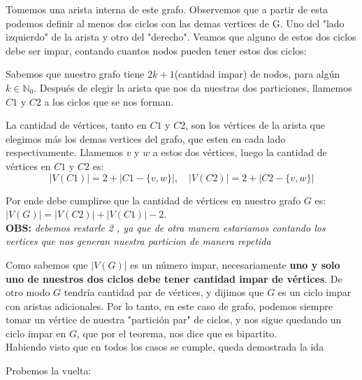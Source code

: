 \documentclass{article}
\begin{document}
\begin{itemize}
\begin{center}
\end{center}
Tomemos una arista interna de este grafo. Observemos que a partir de esta  podemos definir al menos dos ciclos con las demas vertices de G. Uno del "lado izquierdo" de la arista y otro del "derecho". Veamos que alguno de estos dos ciclos debe ser impar, contando cuantos nodos pueden tener estos dos ciclos:

Sabemos que nuestro grafo tiene $2k + 1$(cantidad impar) de nodos, para algún $k \in \mathbb{N}_0$. Después de elegir la arista que nos da nuestras dos particiones, llamemos $C1$ y $C2$ a los ciclos que se nos forman.

La cantidad de vértices, tanto en $C1$ y $C2$, son los vértices de la arista que elegimos más los demas vertices del grafo, que esten en cada lado respectivamente. Llamemos $v$ y $w$ a estos dos vértices, luego la cantidad de vértices en $C1$ y $C2$ es:
\[|V(C1)| = 2 + |C1 - \{v,w\}|, \quad |V(C2)| = 2 + |C2 - \{v,w\}|\]

Por ende debe cumplirse que la cantidad de vértices en nuestro grafo $G$ es:  $ |V(G)| = |V(C2)| + |V(C1)| - 2$.\\
\textbf{OBS:}\textit{ debemos restarle 2 , ya que de otra manera estariamos contando los vertices que nos generan nuestra particion de manera repetida}

Como sabemos que $|V(G)|$ es un número impar, necesariamente \textbf{uno y solo uno de nuestros dos ciclos debe tener cantidad impar de vértices}. De otro modo $G$ tendría cantidad par de vértices, y dijimos que $G$ es un ciclo impar con aristas adicionales. Por lo tanto, en este caso de grafo, podemos siempre tomar un vértice de nuestra "partición par" de ciclos, y nos sigue quedando un ciclo impar en $G$, que por el teorema, nos dice que es bipartito.\\

Habiendo visto que en todos los casos se cumple, queda demostrada la ida

\end{itemize}
Probemos la vuelta: \\
\end{document}
